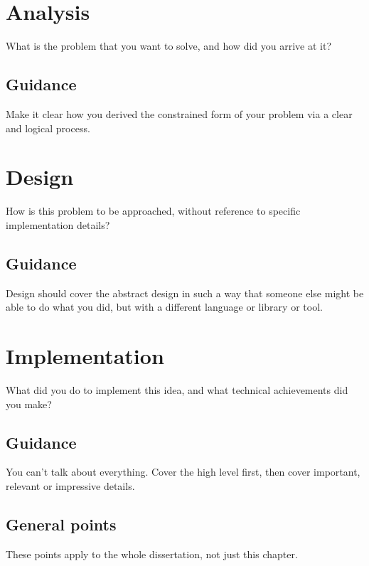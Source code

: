 \documentclass{l4proj}
\begin{document}
\chapter{Analysis}
What is the problem that you want to solve, and how did you arrive at it?

\section{Guidance}
Make it clear how you derived the constrained form of your problem via a clear and logical process. 

\chapter{Design} \label{design}
How is this problem to be approached, without reference to specific implementation details? 

\section{Guidance}
Design should cover the abstract design in such a way that someone else might be able to do what you did, but with a different language or library or tool.

\chapter{Implementation} \label{implementation}
What did you do to implement this idea, and what technical achievements did you make?
\section{Guidance}
You can't talk about everything. Cover the high level first, then cover important, relevant or impressive details.



\section{General points}

These points apply to the whole dissertation, not just this chapter.
\end{document}
